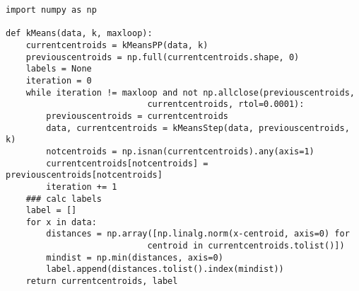 \documentclass{article}
\begin{document}
\begin{verbatim}
import numpy as np
    
def kMeans(data, k, maxloop):
    currentcentroids = kMeansPP(data, k)
    previouscentroids = np.full(currentcentroids.shape, 0)
    labels = None
    iteration = 0
    while iteration != maxloop and not np.allclose(previouscentroids, 
                            currentcentroids, rtol=0.0001):
        previouscentroids = currentcentroids
        data, currentcentroids = kMeansStep(data, previouscentroids, k)
        notcentroids = np.isnan(currentcentroids).any(axis=1)
        currentcentroids[notcentroids] = previouscentroids[notcentroids]
        iteration += 1
    ### calc labels
    label = []
    for x in data:
        distances = np.array([np.linalg.norm(x-centroid, axis=0) for 
                            centroid in currentcentroids.tolist()])
        mindist = np.min(distances, axis=0)
        label.append(distances.tolist().index(mindist))  
    return currentcentroids, label
\end{verbatim}
\end{document}
